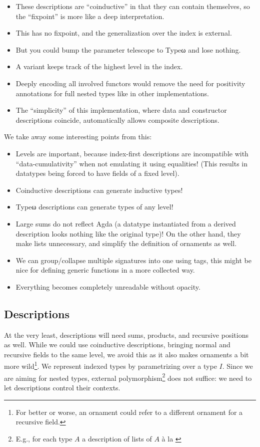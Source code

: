 \begin{itemize}
    \item[*] These descriptions are ``coinductive'' in that they can contain themselves, so the ``fixpoint'' is more like a deep interpretation.
    \item[**] This has no fixpoint, and the generalization over the index is external.
    \item[***] But you could bump the parameter telescope to Typeω and lose nothing.
    \item[*4] A variant keeps track of the highest level in the index.
    \item[?1] Deeply encoding all involved functors would remove the need for positivity annotations for full nested types like in other implementations.
    \item[?2] The ``simplicity'' of this implementation, where data and constructor descriptions coincide, automatically allows composite descriptions.
\end{itemize}

We take away some interesting points from this:
\begin{itemize}
    \item Levels are important, because index-first descriptions are incompatible with ``data-cumulativity'' when not emulating it using equalities! (This results in datatypes being forced to have fields of a fixed level).
    \item Coinductive descriptions can generate inductive types!
    \item Typeω descriptions can generate types of any level!
    \item Large sums do not reflect Agda (a datatype instantiated from a derived description looks nothing like the original type)! On the other hand, they make lists unnecessary, and simplify the definition of ornaments as well.
    \item We can group/collapse multiple signatures into one using tags, this might be nice for defining generic functions in a more collected way.
    \item Everything becomes completely unreadable without opacity.
\end{itemize}


\subsection{Descriptions}
At the very least, descriptions will need sums, products, and recursive positions as well. While we could use coinductive descriptions, bringing normal and recursive fields to the same level, we avoid this as it also makes ornaments a bit more wild\footnote{For better or worse, an ornament could refer to a different ornament for a recursive field.}. We represent indexed types by parametrizing over a type $I$. Since we are aiming for nested types, external polymorphism\footnote{E.g., for each type $A$ a description of lists of $A$ à la \cite{progorn}} does not suffice: we need to let descriptions control their contexts.


